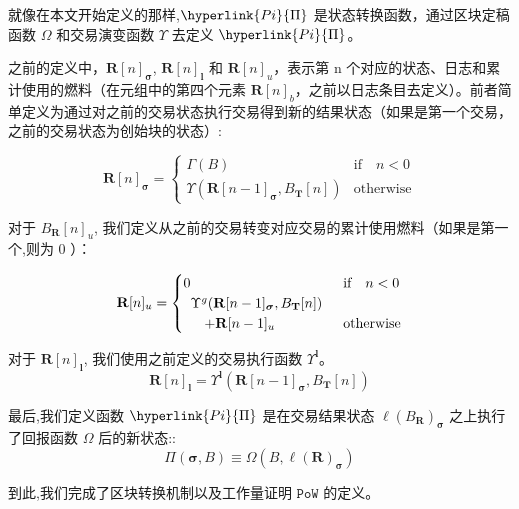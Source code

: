 \documentclass[9pt,oneside]{amsart}
\begin{document}
\begin{multicols}{2}
就像在本文开始定义的那样,$\hyperlink{Pi}{\Pi}$ 是状态转换函数，通过区块定稿函数 \hyperlink{Omega}{$\Omega$} 和交易演变函数 \hyperlink{Upsilon_state_transition}{$\Upsilon$} 去定义 $\hyperlink{Pi}{\Pi}$。

之前的定义中，$\mathbf{R}[n]_{\boldsymbol{\sigma}}$, $\mathbf{R}[n]_\mathbf{l}$ 和 $\mathbf{R}[n]_u$，表示第 n 个对应的状态、日志和累计使用的燃料（在元组中的第四个元素 $\mathbf{R}[n]_b$，之前以日志条目去定义）。前者简单定义为通过对之前的交易状态执行交易得到新的结果状态（如果是第一个交易，之前的交易状态为创始块的状态）:

\begin{equation}
\mathbf{R}[n]_{\boldsymbol{\sigma}} = \begin{cases} \Gamma(B) & \text{if} \quad n < 0 \\ \Upsilon(\mathbf{R}[n - 1]_{\boldsymbol{\sigma}}, B_\mathbf{T}[n]) & \text{otherwise} \end{cases}
\end{equation}

对于 $B_\mathbf{R}[n]_u$, 我们定义从之前的交易转变对应交易的累计使用燃料（如果是第一个,则为 0 ）：

\begin{equation}
\mathbf{R}[n]_u = \begin{cases} 0 & \text{if} \quad n < 0 \\
\begin{array}[b]{l}
\Upsilon^g(\mathbf{R}[n - 1]_{\boldsymbol{\sigma}}, B_\mathbf{T}[n])\\ \quad + \mathbf{R}[n-1]_u
\end{array}
 & \text{otherwise} \end{cases}
\end{equation}

对于 $\mathbf{R}[n]_\mathbf{l}$, 我们使用之前定义的交易执行函数 $\Upsilon^\mathbf{l}$。
\begin{equation}
\mathbf{R}[n]_\mathbf{l} =
\Upsilon^\mathbf{l}(\mathbf{R}[n - 1]_{\boldsymbol{\sigma}}, B_\mathbf{T}[n])
\end{equation}

最后,我们定义函数 $\hyperlink{Pi}{\Pi}$ 是在交易结果状态 $\ell(B_\mathbf{R})_{\boldsymbol{\sigma}}$ 之上执行了回报函数 \hyperlink{Omega}{$\Omega$} 后的新状态::
\begin{equation}
\Pi(\boldsymbol{\sigma}, B) \equiv \Omega(B, \ell(\mathbf{R})_{\boldsymbol{\sigma}})
\end{equation}

到此,我们完成了区块转换机制以及工作量证明 $\mathtt{PoW}$ 的定义。


\end{multicols}
\end{document}
